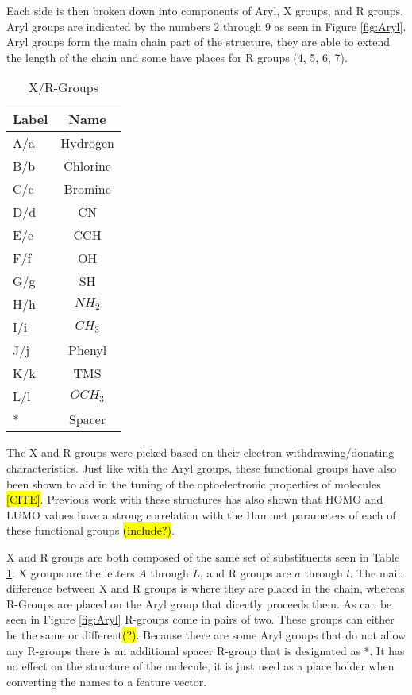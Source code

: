 \documentclass[10pt]{article}
\begin{document}
Each side is then broken down into components of Aryl, X groups, and R groups. Aryl groups are indicated by the numbers 2 through 9 as seen in Figure \ref{fig:Aryl}. Aryl groups form the main chain part of the structure, they are able to extend the length of the chain and some have places for R groups (4, 5, 6, 7).

\begin{table}[H]
  \centering
  \caption{X/R-Groups}
  \begin{tabular}{lc}
    Label   & Name      \\
    \hline
    A/a     & Hydrogen  \\
    B/b     & Chlorine  \\
    C/c     & Bromine   \\
    D/d     & CN        \\
    E/e     & CCH       \\
    F/f     & OH        \\
    G/g     & SH        \\
    H/h     & $NH_2$    \\
    I/i     & $CH_3$    \\
    J/j     & Phenyl    \\
    K/k     & TMS       \\
    L/l     & $OCH_3$   \\
    *       & Spacer    \\
    \hline
  \end{tabular}
  \label{tab:xrgroups}
\end{table}

The X and R groups were picked based on their electron withdrawing/donating characteristics. Just like with the Aryl groups, these functional groups have also been shown to aid in the tuning of the optoelectronic properties of molecules \hl{[CITE]}. Previous work with these structures has also shown that HOMO and LUMO values have a strong correlation with the Hammet parameters of each of these functional groups \hl{(include?)}.


X and R groups are both composed of the same set of substituents seen in Table \ref{tab:xrgroups}. X groups are the letters $A$ through $L$, and R groups are $a$ through $l$. The main difference between X and R groups is where they are placed in the chain, whereas R-Groups are placed on the Aryl group that directly proceeds them. As can be seen in Figure \ref{fig:Aryl} R-groups come in pairs of two. These groups can either be the same or different\hl{(?)}. Because there are some Aryl groups that do not allow any R-groups there is an additional spacer R-group that is designated as *. It has no effect on the structure of the molecule, it is just used as a place holder when converting the names to a feature vector.
\end{document}
